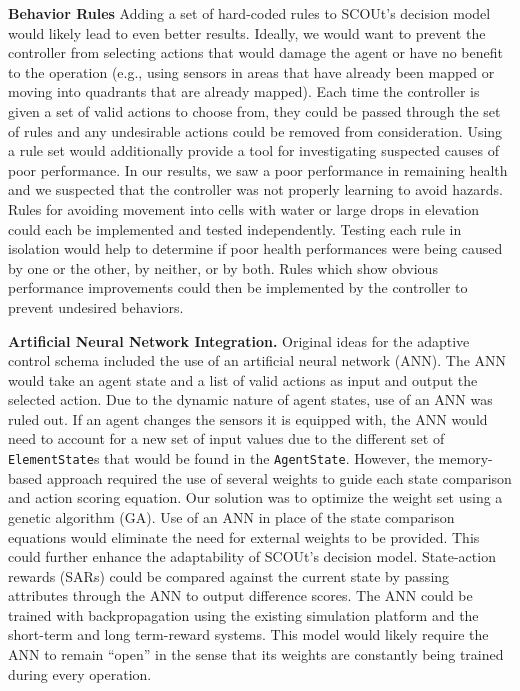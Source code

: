 \noindent
\textbf{Behavior Rules}
Adding a set of hard-coded rules to SCOUt's decision model would likely lead to even better results.
Ideally, we would want to prevent the controller from selecting actions that would damage the agent or have no benefit to the operation (e.g., using sensors in areas that have already been mapped or moving into quadrants that are already mapped).
Each time the controller is given a set of valid actions to choose from, they could be passed through the set of rules and any undesirable actions could be removed from consideration.
Using a rule set would additionally provide a tool for investigating suspected causes of poor performance.
In our results, we saw a poor performance in remaining health and we suspected that the controller was not properly learning to avoid hazards.
Rules for avoiding movement into cells with water or large drops in elevation could each be implemented and tested independently.
Testing each rule in isolation would help to determine if poor health performances were being caused by one or the other, by neither, or by both.
Rules which show obvious performance improvements could then be implemented by the controller to prevent undesired behaviors.

\noindent
\textbf{Artificial Neural Network Integration.}
Original ideas for the adaptive control schema included the use of an artificial neural network (ANN).
The ANN would take an agent state and a list of valid actions as input and output the selected action.
Due to the dynamic nature of agent states, use of an ANN was ruled out.
If an agent changes the sensors it is equipped with, the ANN would need to account for a new set of input values due to the different set of \texttt{ElementState}s that would be found in the \texttt{AgentState}.
However, the memory-based approach required the use of several weights to guide each state comparison and action scoring equation.
Our solution was to optimize the weight set using a genetic algorithm (GA).
Use of an ANN in place of the state comparison equations would eliminate the need for external weights to be provided.
This could further enhance the adaptability of SCOUt's decision model.
State-action rewards (SARs) could be compared against the current state by passing attributes through the ANN to output difference scores.
The ANN could be trained with backpropagation using the existing simulation platform and the short-term and long term-reward systems.
This model would likely require the ANN to remain ``open'' in the sense that its weights are constantly being trained during every operation.

